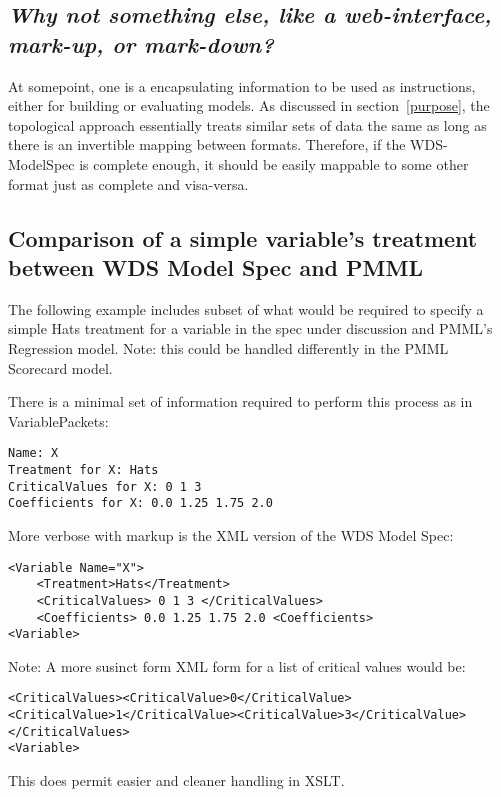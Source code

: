 \documentclass[10pt]{article}
\begin{document}
\subsection{\em Why not something else, like a web-interface, mark-up, or mark-down?\label{WhyNotHTML}}
At somepoint, one is a encapsulating information to be used as instructions, either for building or evaluating models.
As discussed in section~\ref{purpose}, the  topological approach essentially treats 
similar sets of data the same as long as there is an invertible mapping between formats.  Therefore,
if the WDS-ModelSpec is complete enough, it should be easily mappable to some other format just as complete and visa-versa.


\fi

\subsection{Comparison of a simple variable's treatment between WDS Model Spec and PMML\label{hat_comparison}}

The following example includes subset of what would be required to specify a simple Hats treatment for 
a variable in the spec under discussion and PMML's Regression model.  {Note: this could be handled differently 
in the PMML Scorecard model.}

There is a minimal set of information required to perform this process as in VariablePackets:
\begin{Verbatim}[fontsize=\small,baselinestretch=0.75,formatcom=\color{red}]
Name: X
Treatment for X: Hats
CriticalValues for X: 0 1 3
Coefficients for X: 0.0 1.25 1.75 2.0
\end{Verbatim}
More verbose with markup is the XML version of the WDS Model Spec:
\begin{Verbatim}[fontsize=\small,baselinestretch=0.75,formatcom=\color{red}]
<Variable Name="X">
    <Treatment>Hats</Treatment>
    <CriticalValues> 0 1 3 </CriticalValues>
    <Coefficients> 0.0 1.25 1.75 2.0 <Coefficients>
<Variable>
\end{Verbatim}

Note: A more susinct form XML form for a list of critical values would be:
\begin{Verbatim}[fontsize=\small,baselinestretch=0.75,formatcom=\color{red}]
    <CriticalValues><CriticalValue>0</CriticalValue><CriticalValue>1</CriticalValue><CriticalValue>3</CriticalValue></CriticalValues>
<Variable>
\end{Verbatim}
This does permit easier and cleaner handling in XSLT.
\end{document}
